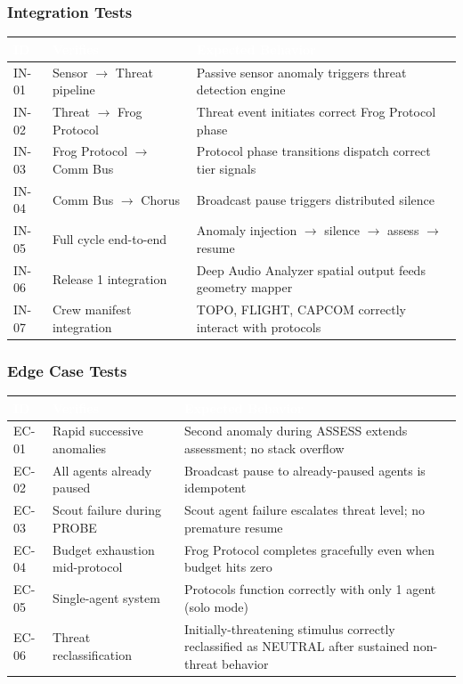 \documentclass[11pt,letterpaper]{article}
\newcommand{\tableheader}[1]{\textbf{\sffamily\textcolor{white}{#1}}}
\begin{document}
\subsubsection{Integration Tests}

\begin{center}
\begin{tabularx}{\textwidth}{C{1.2cm}L{3.5cm}X}
\toprule
{}
\tableheader{ID} & \tableheader{Verifies} & \tableheader{Expected Behavior} \\
\midrule
IN-01 & Sensor $\to$ Threat pipeline & Passive sensor anomaly triggers threat detection engine \\
IN-02 & Threat $\to$ Frog Protocol & Threat event initiates correct Frog Protocol phase \\
IN-03 & Frog Protocol $\to$ Comm Bus & Protocol phase transitions dispatch correct tier signals \\
IN-04 & Comm Bus $\to$ Chorus & Broadcast pause triggers distributed silence \\
IN-05 & Full cycle end-to-end & Anomaly injection $\to$ silence $\to$ assess $\to$ resume \\
IN-06 & Release 1 integration & Deep Audio Analyzer spatial output feeds geometry mapper \\
IN-07 & Crew manifest integration & TOPO, FLIGHT, CAPCOM correctly interact with protocols \\
\bottomrule
\end{tabularx}
\end{center}

\subsubsection{Edge Case Tests}

\begin{center}
\begin{tabularx}{\textwidth}{C{1.2cm}L{3.5cm}X}
\toprule
{}
\tableheader{ID} & \tableheader{Verifies} & \tableheader{Expected Behavior} \\
\midrule
EC-01 & Rapid successive anomalies & Second anomaly during ASSESS extends assessment; no stack overflow \\
EC-02 & All agents already paused & Broadcast pause to already-paused agents is idempotent \\
EC-03 & Scout failure during PROBE & Scout agent failure escalates threat level; no premature resume \\
EC-04 & Budget exhaustion mid-protocol & Frog Protocol completes gracefully even when budget hits zero \\
EC-05 & Single-agent system & Protocols function correctly with only 1 agent (solo mode) \\
EC-06 & Threat reclassification & Initially-threatening stimulus correctly reclassified as NEUTRAL after sustained non-threat behavior \\
\bottomrule
\end{tabularx}
\end{center}
\end{document}
